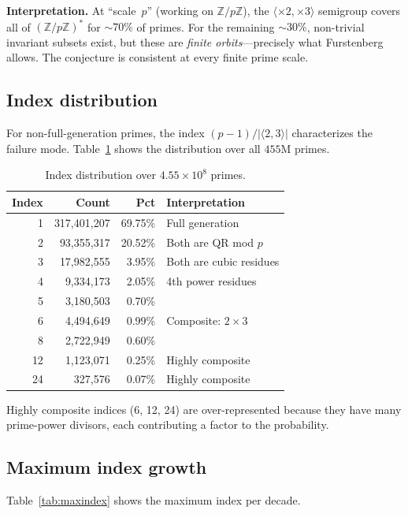 \documentclass[11pt,a4paper]{article}
\begin{document}
\textbf{Interpretation.}
At ``scale~$p$'' (working on $\mathbb{Z}/p\mathbb{Z}$), the
$\langle \times 2, \times 3 \rangle$ semigroup covers all of
$(\mathbb{Z}/p\mathbb{Z})^*$ for $\sim 70\%$ of primes.
For the remaining $\sim 30\%$, non-trivial invariant subsets exist,
but these are \emph{finite orbits}---precisely what Furstenberg allows.
The conjecture is consistent at every finite prime scale.

\subsection{Index distribution}

For non-full-generation primes, the index $(p-1)/|\langle 2, 3 \rangle|$
characterizes the failure mode.
Table~\ref{tab:index} shows the distribution over all $455$M primes.

\begin{table}[h]
\centering
\caption{Index distribution over $4.55 \times 10^8$ primes.}
\label{tab:index}
\begin{tabular}{rrrl}
\toprule
Index & Count & Pct & Interpretation \\
\midrule
1 & 317,401,207 & 69.75\% & Full generation \\
2 &  93,355,317 & 20.52\% & Both are QR mod $p$ \\
3 &  17,982,555 &  3.95\% & Both are cubic residues \\
4 &   9,334,173 &  2.05\% & 4th power residues \\
5 &   3,180,503 &  0.70\% & \\
6 &   4,494,649 &  0.99\% & Composite: $2 \times 3$ \\
8 &   2,722,949 &  0.60\% & \\
12 &  1,123,071 &  0.25\% & Highly composite \\
24 &    327,576 &  0.07\% & Highly composite \\
\bottomrule
\end{tabular}
\end{table}

Highly composite indices (6, 12, 24) are over-represented
because they have many prime-power divisors, each contributing
a factor to the probability.

\subsection{Maximum index growth}

Table~\ref{tab:maxindex} shows the maximum index per decade.
\end{document}
